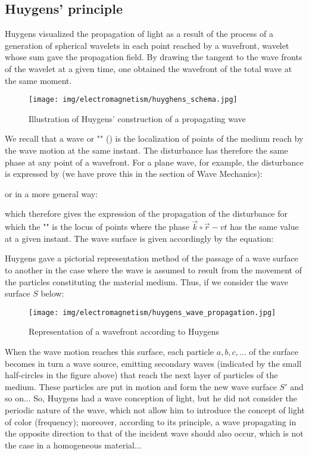 	\subsection{Huygens' principle}
	Huygens visualized the propagation of light as a result of the process of a generation of spherical wavelets in each point reached by a wavefront, wavelet whose sum gave the propagation field. By drawing the tangent to the wave fronts of the wavelet at a given time, one obtained the wavefront of the total wave at the same moment.
	\begin{figure}[H]
		\centering
		\texttt{[image: img/electromagnetism/huyghens\_schema.jpg]}
		\caption{Illus­tra­tion of Huy­gens' con­struc­tion of a prop­a­gat­ing wave}
	\end{figure}
	We recall that a wave or "" () is the localization of points of the medium reach by the wave motion at the same instant. The disturbance has therefore the same phase at any point of a wavefront. For a plane wave, for example, the disturbance is expressed by (we have prove this in the section of Wave Mechanics):
	
	or in a more general way:
	
	which therefore gives the expression of the propagation of the disturbance for which the "" is the locus of points where the phase $\vec{k}\circ\vec{r}-vt$ has the same value at a given instant. The wave surface is given accordingly by the equation:
	
	Huygens gave a pictorial representation method of the passage of a wave surface to another in the case where the wave is assumed to result from the movement of the particles constituting the material medium. Thus, if we consider the wave surface $S$ below:
	\begin{figure}[H]
		\centering
		\texttt{[image: img/electromagnetism/huygens\_wave\_propagation.jpg]}
		\caption{Representation of a wavefront according to Huygens}
	\end{figure}
	When the wave motion reaches this surface, each particle $a, b, c, ...$ of the surface becomes in turn a wave source, emitting secondary waves (indicated by the small half-circles in the figure above) that reach the next layer of particles of the medium. These particles are put in motion and form the new wave surface $S'$ and so on... So, Huygens had a wave conception of light, but he did not consider the periodic nature of the wave, which not allow him to introduce the concept of light of color (frequency); moreover, according to its principle, a wave propagating in the opposite direction to that of the incident wave should also occur, which is not the case in a homogeneous material...
	
